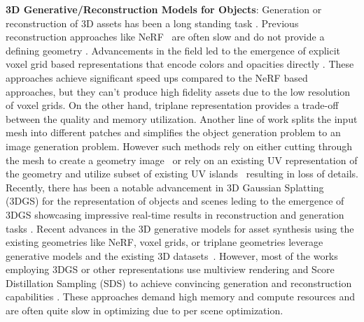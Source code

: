 \noindent\textbf{3D Generative/Reconstruction Models for Objects}:
%
Generation or reconstruction of 3D assets has been a long standing task \cite{dreamfusion2022, magic3d2023, prolificdreamer2024, dreambooth3d2023, latentnerf2023, gaussiandreamer2023, dreamcraft3d2023, makeit3d2023, eg3d2022, albedogan2024, 3dfacecam2023, tsdf2024, genheld2024}. Previous reconstruction approaches like NeRF~\cite{nerf2021, mipnerf2021} are often slow and do not provide a defining geometry \cite{latentnerf2023, dreambooth3d2023, neaf2023, udiff2024, tensorf2022, dnerf2021, plenoxels2022, neus22023, neusurf2024, geodream2023, zeroshot2024}. Advancements in the field led to the emergence of explicit voxel grid based representations that encode colors and opacities directly \cite{sdfusion2023, diffrf2023, volumediffusion2023}. These approaches achieve significant speed ups compared to the NeRF based approaches, but they can't produce high fidelity assets due to the low resolution of voxel grids. On the other hand, triplane representation \cite{3dgen2023, triplanemeetsgs2024, triplanediff2023, rodin2023} provides a trade-off between the quality and memory utilization. 
Another line of work \cite{geometry_img_diffusion2024, omages2024} splits the input mesh into different patches and simplifies the object generation problem to an image generation problem. 
However such methods rely on either cutting through the mesh to create a geometry image~\cite{geometry_img_diffusion2024} or rely on an existing UV representation of the geometry and utilize subset of existing UV islands~\cite{omages2024} resulting in loss of details. 
Recently, there has been a notable advancement in 3D Gaussian Splatting (3DGS) for the representation of objects and scenes leding to the emergence of 3DGS showcasing impressive real-time results in reconstruction and generation tasks \cite{3dgs2023, 4dgs_realtimescene2024, dngaussian2024, gaussiandreamer2023, dreamgaussian2023, viewconsistentediting3dgs2025, gsedit2024, grm2024, triplanemeetsgs2024, gslrm2025, gvgen2025}. 
%
Recent advances in the 3D generative models for asset synthesis using the existing geometries like NeRF, voxel grids, or triplane geometries \cite{dreamgaussian2023, grm2024, triplanemeetsgs2024, gslrm2025, get3d2022, difftf2023} leverage generative models \cite{stable_diffusion, ddim} and the existing 3D datasets~\cite{shapenet2015, objaverse2023}. However, most of the works employing 3DGS or other representations use multiview rendering and Score Distillation Sampling (SDS) to achieve convincing generation and reconstruction capabilities \cite{textto3Dusinggs2024, dreamfusion2022}. These approaches demand high memory and compute resources and are often quite slow in optimizing due to per scene optimization. 



